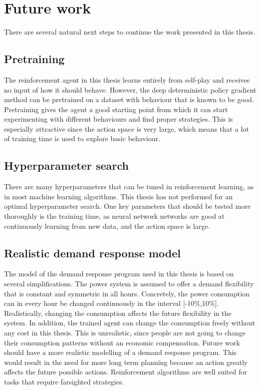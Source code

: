 \documentclass[class=book, crop=false, 11pt]{standalone}
\begin{document}
\section*{Future work}
There are several natural next steps to continue the work presented in this thesis. 

\subsection*{Pretraining}
The reinforcement agent in this thesis learns entirely from self-play and receives no input of how it should behave. However, the deep deterministic policy gradient method can be pretrained on a dataset with behaviour that is known to be good. Pretraining gives the agent a good starting point from which it can start experimenting with different behaviours and find proper strategies. This is especially attractive since the action space is very large, which means that a lot of training time is used to explore basic behaviour.

\subsection*{Hyperparameter search}
There are many hyperparameters that can be tuned in reinforcement learning, as in most machine learning algorithms. This thesis has not performed for an optimal hyperparameter search. One key parameters that should be tested more thoroughly is the training time, as neural network networks are good at continuously learning from new data, and the action space is large.     
\subsection*{Realistic demand response model}
The model of the demand response program used in this thesis is based on several simplifications. The power system is assumed to offer a demand flexibility that is constant and symmetric in all hours. Concretely, the power consumption can in every hour be changed continuously in the interval [-10\%,10\%]. Realistically, changing the consumption affects the future flexibility in the system. In addition, the trained agent can change the consumption freely without any cost in this thesis. This is unrealistic, since people are not going to change their consumption patterns without an economic compensation. Future work should have a more realistic modelling of a demand response program. This would result in the need for more long term planning because an action greatly affects the future possible actions. Reinforcement algorithms are well suited for tasks that require farsighted strategies. 
\end{document}
